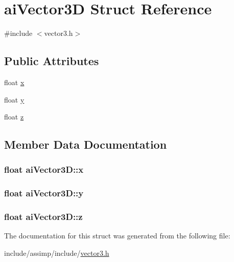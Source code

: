 \hypertarget{structai_vector3_d}{\section{ai\-Vector3\-D Struct Reference}
\label{structai_vector3_d}
}


{\ttfamily \#include $<$vector3.\-h$>$}

\subsection*{Public Attributes}
\begin{DoxyCompactItemize}
\item 
float \hyperlink{structai_vector3_d_a3762d39eeb99def9ebd413b2bb8dd470}{x}
\item 
float \hyperlink{structai_vector3_d_ac7b5fcc03324f8c3bc8429c95882dfb8}{y}
\item 
float \hyperlink{structai_vector3_d_a2b93b892064995e8d24f4e3352175aae}{z}
\end{DoxyCompactItemize}


\subsection{Member Data Documentation}
\hypertarget{structai_vector3_d_a3762d39eeb99def9ebd413b2bb8dd470}{
\subsubsection[{x}]{\setlength{\rightskip}{0pt plus 5cm}float ai\-Vector3\-D\-::x}}\label{structai_vector3_d_a3762d39eeb99def9ebd413b2bb8dd470}
\hypertarget{structai_vector3_d_ac7b5fcc03324f8c3bc8429c95882dfb8}{
\subsubsection[{y}]{\setlength{\rightskip}{0pt plus 5cm}float ai\-Vector3\-D\-::y}}\label{structai_vector3_d_ac7b5fcc03324f8c3bc8429c95882dfb8}
\hypertarget{structai_vector3_d_a2b93b892064995e8d24f4e3352175aae}{
\subsubsection[{z}]{\setlength{\rightskip}{0pt plus 5cm}float ai\-Vector3\-D\-::z}}\label{structai_vector3_d_a2b93b892064995e8d24f4e3352175aae}


The documentation for this struct was generated from the following file\-:\begin{DoxyCompactItemize}
\item 
include/assimp/include/\hyperlink{vector3_8h}{vector3.\-h}\end{DoxyCompactItemize}
